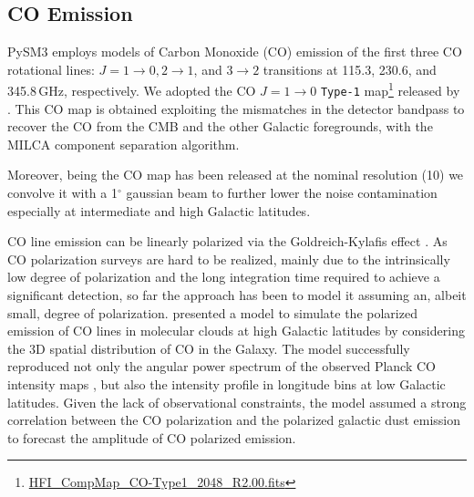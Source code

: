 \documentclass[twocolumn]{aastex631}
\begin{document}

\subsection{CO Emission}

PySM3 employs models of Carbon Monoxide (CO) emission  of  the first three CO rotational lines: $J = 1\rightarrow0, 2\rightarrow1$, and $3\rightarrow2$ transitions at 115.3, 230.6, and 345.8\,GHz, respectively. We adopted  the CO $J = 1\rightarrow0$ \texttt{Type-1} map\footnote{\url{HFI_CompMap_CO-Type1_2048_R2.00.fits}} released by \citet{2014A&A...571A..13P}.  This CO map is obtained exploiting the mismatches in the detector bandpass to recover the CO from the CMB and the other Galactic foregrounds, with the MILCA component separation algorithm.  
 
Moreover, being the  CO map has been released at the nominal resolution (10\arcmin) we convolve it with a 1$^\circ$ gaussian beam to further lower the noise contamination  especially at intermediate and high Galactic latitudes.

CO line emission can be linearly polarized via the Goldreich-Kylafis effect \citep{Goldreich:1981, Crutcher:2012}.  As CO polarization surveys are hard to be realized,  mainly due to the intrinsically low degree of polarization and the long integration time required to achieve a significant detection,  so far the approach has been to model it assuming an, albeit small, degree of polarization. \citet{Puglisi:2017} presented a model to simulate the polarized emission of CO lines in molecular clouds at high Galactic latitudes by considering the 3D spatial distribution of CO in the Galaxy. The model   successfully reproduced not only the angular power spectrum of the observed Planck  CO intensity maps \citep{planck2013-p03a},  but also the intensity profile  in longitude bins at low Galactic latitudes.  Given the lack of observational constraints, the model assumed a strong correlation between the CO polarization and the polarized galactic dust emission to forecast the amplitude of CO polarized emission. 
\end{document}
